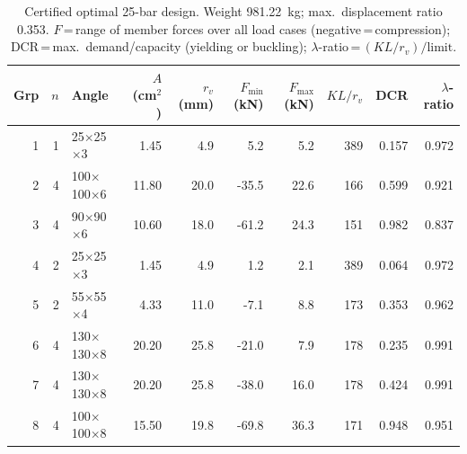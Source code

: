 \begin{table}[tbp]
\centering\footnotesize\setlength{\tabcolsep}{3pt}
\caption{Certified optimal 25-bar design. Weight 981.22~kg; max.\ displacement ratio 0.353.
$F$\,=\,range of member forces over all load cases (negative\,=\,compression);
DCR\,=\,max.\ demand/capacity (yielding or buckling); $\lambda$-ratio\,=\,$(KL/r_v)/\text{limit}$.}
\label{tab:design25bar}
\begin{tabular}{@{}rrlrrrrrrr@{}}
\toprule
Grp & $n$ & Angle & $A$ (cm$^2$) & $r_v$ (mm) & $F_{\min}$ (kN) & $F_{\max}$ (kN) & $KL/r_v$ & DCR & $\lambda$-ratio\\
\midrule
1 & 1 & 25$\times$25$\times$3 & 1.45 & 4.9 & 5.2 & 5.2 & 389 & 0.157 & 0.972\\
2 & 4 & 100$\times$100$\times$6 & 11.80 & 20.0 & -35.5 & 22.6 & 166 & 0.599 & 0.921\\
3 & 4 & 90$\times$90$\times$6 & 10.60 & 18.0 & -61.2 & 24.3 & 151 & 0.982 & 0.837\\
4 & 2 & 25$\times$25$\times$3 & 1.45 & 4.9 & 1.2 & 2.1 & 389 & 0.064 & 0.972\\
5 & 2 & 55$\times$55$\times$4 & 4.33 & 11.0 & -7.1 & 8.8 & 173 & 0.353 & 0.962\\
6 & 4 & 130$\times$130$\times$8 & 20.20 & 25.8 & -21.0 & 7.9 & 178 & 0.235 & 0.991\\
7 & 4 & 130$\times$130$\times$8 & 20.20 & 25.8 & -38.0 & 16.0 & 178 & 0.424 & 0.991\\
8 & 4 & 100$\times$100$\times$8 & 15.50 & 19.8 & -69.8 & 36.3 & 171 & 0.948 & 0.951\\
\bottomrule
\end{tabular}
\end{table}
